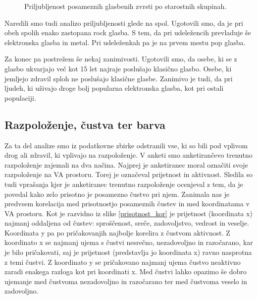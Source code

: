 \documentclass[a4paper, 12pt]{book}
\begin{document}
{\begin{figure}[hbt]
\caption{Priljubljenost posameznih glasbenih zvrsti po starostnih skupinah.  }
\label{zanrigraftop}
\end{figure}

Naredili smo tudi analizo priljubljenosti glede na spol. Ugotovili smo, da je pri obeh spolih enako zastopana rock glasba. S tem, da pri udeležencih prevladuje še elektronska glasba in metal. Pri udeleženkah pa je na prvem mestu pop glasba. 

Za konec pa postrežem še nekaj zanimivosti. Ugotovili smo, da osebe, ki se z glasbo ukvarjajo več kot 15 let najraje poslušajo klasično glasbo. Osebe, ki jemljejo zdravil sploh ne poslušajo klasične glasbe. Zanimivo je tudi, da pri ljudeh, ki uživajo droge bolj popularna elektronska glasba, kot pri ostali populaciji.

\subsection{Razpoloženje, čustva ter barva}

Za ta del analize smo iz podatkovne zbirke odstranili vse, ki so bili pod vplivom drog ali zdravil, ki vplivajo na razpoloženje. V anketi smo anketirančevo trenutno razpoloženje zajemali na dva načina. Najprej je anketiranec moral označiti svoje razpoloženje na VA prostoru. Torej je označeval prijetnost in aktivnost. Sledila so tudi vprašanja kjer je anketiranec trenutno razpoloženje ocenjeval z tem, da je povedal kako zelo prisotno je posamezno čustvo pri njem. Zanimala nas je predvsem korelacija med prisotnostjo posameznih čustev in med koordinatama v VA prostoru. Kot je razvidno iz slike \ref{prisotnost_kor} je prijetnost (koordinata x) najmanj oddaljena od čustev: sproščenost, sreče, zadovoljstvo, vedrost in veselje. Koordinata y pa po pričakovanjih najbolje korelira z čustvom aktivnost. Z koordinato  x se najmanj ujema s čustvi nesrečno, nezadovoljno in razočarano, kar je bilo pričakovati, saj je prijetnost (predstavlja jo koordinata x) ravno nasprotna z temi čustvi. Z koordinato y se pričakovano najmanj ujema čustvo neaktivno zaradi enakega razloga kot pri koordinati x. Med čustvi lahko opazimo še dobro ujemanje med čustvoma nezadovoljno in razočarano ter med čustvoma veselo in zadovoljno. 

}
\end{document}
